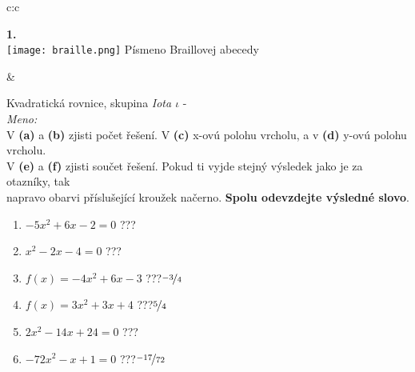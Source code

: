 \documentclass[10pt]{report}
\begin{document}
\begin{tabular}{c:c}
\begin{minipage}[c][99mm][t]{0.49\linewidth}
\begin{center}
\begin{minipage}{0.20\linewidth}
\begin{center}
{\Huge\bfseries 1.} \\[2mm]
\texttt{[image: braille.png]}
{\small Písmeno Braillovej abecedy}
\end{center}
\end{minipage}
\end{center}
\end{minipage}
&
\begin{minipage}[c][99mm][t]{0.49\linewidth}
\begin{center}
\vspace{7mm}
{\huge Kvadratická rovnice, skupina \textit{Iota $\iota$} -}\\[4.5mm]
\textit{Meno:}\phantom{xxxxxxxxxxxxxxxxxxxxxxxxxxxxxxxxxxxxxxxxxxxxxxxxxxxxxxxxxxxxxxxxx}\\[3.5mm]
V \textbf{(a)} a \textbf{(b)} zjisti počet řešení. V \textbf{(c)} x-ovú polohu vrcholu, a v \textbf{(d)} y-ovú polohu vrcholu.\\V \textbf{(e)} a \textbf{(f)} zjisti součet řešení. Pokud ti vyjde stejný výsledek jako je za otazníky, tak\\napravo obarvi příslušející kroužek načerno. \textbf{Spolu odevzdejte výsledné slovo}.\\[3mm]
\begin{minipage}{0.77\linewidth}
\begin{center}
\begin{varwidth}{\textwidth}
\begin{enumerate}
\large
\item $-5x^2+6x-2=0$\quad \dotfill\; ???\;\dotfill {}
\item $x^2-2x-4=0$\quad \dotfill\; ???\;\dotfill {}
\item $f(x)=-4x^2+6x-3$\quad \dotfill\; ???\;\dotfill \quad $\nicefrac{-3}{4}$
\item $f(x)=3x^2+3x+4$\quad \dotfill\; ???\;\dotfill \quad $\nicefrac{5}{4}$
\item $2x^2-14x+24=0$\quad \dotfill\; ???\;\dotfill {}
\item $-72x^2-x+1=0$\quad \dotfill\; ???\;\dotfill \quad $\nicefrac{-17}{72}$
\end{enumerate}
\end{varwidth}
\end{center}
\end{minipage}
\begin{minipage}{0.20\linewidth}

\end{minipage}
\end{center}
\end{minipage}
\end{tabular}
\end{document}
